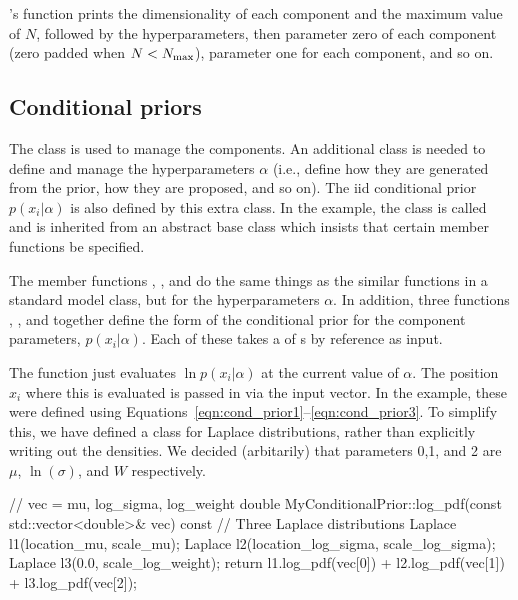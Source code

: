 \documentclass[article, nojss]{jss}
\begin{document}
's  function prints the dimensionality of each
component and the maximum value of $N$, followed by the hyperparameters,
then parameter zero of each component (zero padded when $N<N_{\rm max}$),
parameter one for each component, and so on.

\subsection{Conditional priors}
The  class is used to manage the components. An additional
class is needed to define and manage the hyperparameters $\alpha$ (i.e.,
define how they are generated from the prior, how they are proposed, and
so on). The iid
conditional prior $p(x_i | \alpha)$ is also defined by this extra class.
In the example, the class is called  and
is inherited from an abstract base class 
which insists that certain member functions be specified.

The member functions , , and
 do the same things as the similar functions in a standard model
class, but for the hyperparameters $\alpha$. 
In addition, three functions
, , and 
together define the form of the conditional prior for the
component parameters, $p(x_i | \alpha)$. Each of these takes a
 of s by reference as input.

The  function just evaluates $\ln p(x_i | \alpha)$
at the current value of $\alpha$. The position $x_i$ where this is evaluated
is passed in via the input vector. In the example, these
were defined using Equations~\ref{eqn:cond_prior1}--\ref{eqn:cond_prior3}.
To simplify this, we have defined a class for Laplace distributions,
rather than explicitly writing out the densities. We decided (arbitarily)
that parameters 0,1, and 2 are $\mu$, $\ln(\sigma)$, and $W$ respectively.
\begin{CodeChunk}
\begin{CodeInput}
// vec = {mu, log_sigma, log_weight}
double MyConditionalPrior::log_pdf(const std::vector<double>& vec) const
{
    // Three Laplace distributions
    Laplace l1(location_mu, scale_mu);
    Laplace l2(location_log_sigma, scale_log_sigma);
    Laplace l3(0.0, scale_log_weight);
    return l1.log_pdf(vec[0]) + l2.log_pdf(vec[1]) + l3.log_pdf(vec[2]);
}
\end{CodeInput}
\end{CodeChunk}
\end{document}
